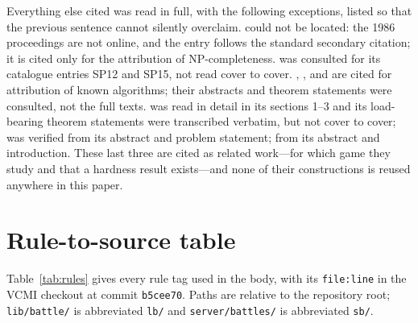 \documentclass[11pt,a4paper]{article}
\theoremstyle{plain}
\theoremstyle{definition}
\theoremstyle{plain}
\theoremstyle{definition}
\theoremstyle{remark}
\newcommand{\src}[1]{\texttt{#1}}
\begin{document}
Everything else cited was read in full, with the following exceptions, listed so that the
previous sentence cannot silently overclaim. \cite{LW86} could not be located: the 1986
proceedings are not online, and the entry follows the standard secondary citation; it is cited
only for the attribution of NP-completeness. \cite{GJ79} was consulted for its catalogue
entries SP12 and SP15, not read cover to cover. \cite{ADHLMS19}, \cite{HT74}, \cite{BM04} and
\cite{DMP64} are cited for attribution of known algorithms; their abstracts and theorem
statements were consulted, not the full texts. \cite{HLW20} was read in detail in its sections 1--3 and
its load-bearing theorem statements were transcribed verbatim, but not cover to cover;
\cite{PS20} was verified from its abstract and problem statement; \cite{BH17} from its
abstract and introduction. These last three are cited as related work---for which game they study
and that a hardness result exists---and none of their constructions is reused anywhere in
this paper.

\section{Rule-to-source table}\label{app:rules}

Table~\ref{tab:rules} gives every rule tag used in the body, with its \src{file:line} in the
VCMI checkout at commit \src{b5cee70}. Paths are relative to the repository root;
\src{lib/battle/} is abbreviated \src{lb/} and \src{server/battles/} is abbreviated
\src{sb/}.
\end{document}
